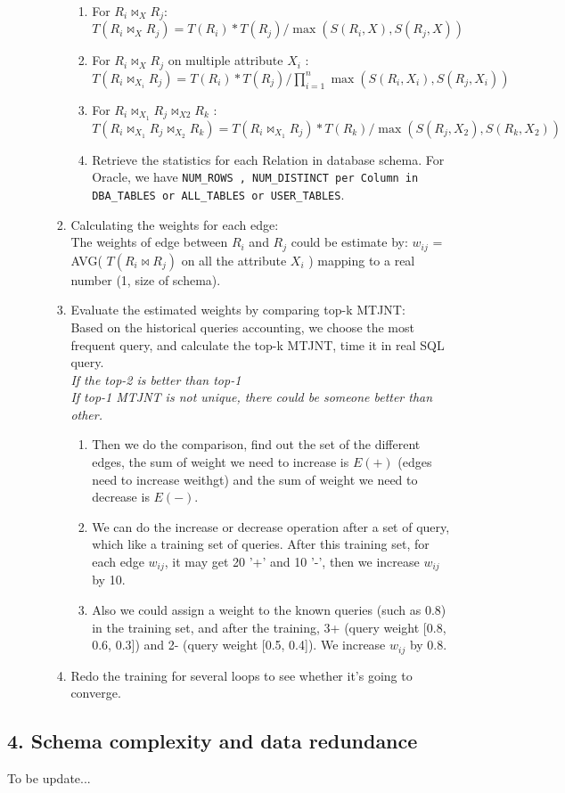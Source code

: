 \begin{enumerate}
\begin{enumerate}
\begin{enumerate}
\begin{enumerate}
    \item For $R_i \Join _X R_j$: \\
    $T(R_i \Join _X R_j)  = T(R_i) * T(R_j) / \max(S(R_i, X), S(R_j, X))$
    \item For $R_i \Join _X R_j$ on multiple attribute $X_i$ : \\
    $T(R_i \Join _{X_i} R_j) = T(R_i) * T(R_j) / \prod_{i=1}^n\max(S(R_i,X_i),S(R_j,X_i))$
    \item For $R_i \Join _{X_1} R_j \Join _{X2} R_k$ :
    $T(R_i \Join _{X_1} R_j \Join _{X_2} R_k) =  T(R_i \Join _{X_1} R_j) * T(R_k) / \max(S(R_j, X_2), S(R_k, X_2))$
  \item Retrieve the statistics for each Relation in database schema. For Oracle, we have \texttt{NUM\string_ROWS , NUM\string_DISTINCT per Column in DBA\string_TABLES or ALL\string_TABLES or USER\string_TABLES}.
    \end{enumerate}
  \item Calculating the weights for each edge:\\
     The weights of edge between $R_i$ and $R_j$ could be estimate by: $w_{ij}$ = AVG( $T(R_i \Join R_j)$ on all the attribute $X_i$ ) mapping to a real number (1, size of schema).
  \item Evaluate the estimated weights by comparing top-k MTJNT:\\
  Based on the historical queries accounting, we choose the most frequent query, and calculate the top-k MTJNT, time it in real SQL query.\\
  {\it If the top-2 is better than top-1}\\
  {\it If top-1 MTJNT is not unique, there could be someone better than other.}\\
    \begin{enumerate}
       \item Then we do the comparison, find out the set of the different edges, the sum of weight we need to increase is $E(+)$ (edges need to increase weithgt) and the sum of weight we need to decrease is $E(-)$.
       \item We can do the increase or decrease operation after a set of query, which like a training set of queries. After this training set, for each edge $w_{ij}$, it may get 20 '+' and 10 '-', then we increase $w_{ij}$ by 10.
       \item Also we could assign a weight to the known queries (such as 0.8) in the training set, and after the training, 3+ (query weight [0.8, 0.6, 0.3]) and 2- (query weight [0.5, 0.4]). We increase $w_{ij}$ by 0.8.
    \end{enumerate}
  \item Redo the training for several loops to see whether it's going to converge.
  \end{enumerate}
\end{enumerate}
\end{enumerate}
\begin{center}
{\section*{{\normalsize\bf 4. Schema complexity and data redundance}}}
To be update...
\end{center}

